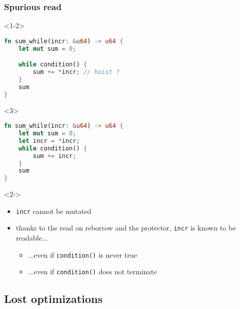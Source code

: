 

\begin{frame}[fragile, t]
    \frametitle{{\cmark} Spurious read}
    \begin{onlyenv}<1-2>
        \begin{block}{}
            \begin{lstlisting}[language=rust]
fn sum_while(incr: &u64) -> u64 {
    let mut sum = 0;

    while condition() {
        sum += *incr; // hoist ?
    }
    sum
}
            \end{lstlisting}
        \end{block}
    \end{onlyenv}

    \begin{onlyenv}<3>
        \begin{block}{}
            \begin{lstlisting}[language=rust]
fn sum_while(incr: &u64) -> u64 {
    let mut sum = 0;
    let incr = *incr;
    while condition() {
        sum += incr;
    }
    sum
}
            \end{lstlisting}
        \end{block}
    \end{onlyenv}

    \begin{onlyenv}<2->
        \begin{block}{}
            \begin{itemize}
                \item \texttt{incr} cannot be mutated
                \item thanks to the read on reborrow and the protector, \texttt{incr} is known to be readable...
                    \begin{itemize}
                        \item ...even if \texttt{condition()} is never true
                        \item ...even if \texttt{condition()} does not terminate
                    \end{itemize}
            \end{itemize}
        \end{block}
    \end{onlyenv}
\end{frame}

\subsection{Lost optimizations}

